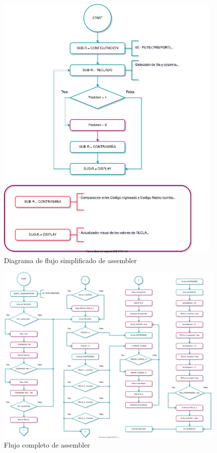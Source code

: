 \documentclass{article}
\begin{document}
\begin{figure}[H]
\centering
	\includegraphics[width = 0.98\textwidth]{flujo_asm_general.png}
	\caption{Diagrama de flujo simplificado de assembler}
\end{figure}

\begin{figure}[H]
	\centering
	\includegraphics[width = \textwidth]{flujo_asm_completo.png}
	\caption{Flujo completo de assembler}
\end{figure}
\end{document}
